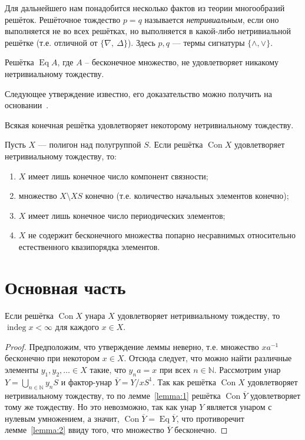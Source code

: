 \documentclass[11pt,twoside,final
]{article}
\def\Con{\operatorname{Con}}
\def\Eq{\operatorname{Eq}}
\def\indeg{\operatorname{indeg}}
\begin{document}
Для дальнейшего нам понадобится несколько фактов из теории многообразий решёток.
Решёточное тождество $p = q$ называется \textit{нетривиальным}, если оно выполняется не во всех решётках, но выполняется в какой-либо нетривиальной решётке (т.е. отличной от $\{\nabla,\ \Delta\}$).
Здесь $p,q$ — термы сигнатуры $\{ \land , \lor \}$.

\begin{lemma} \label{lemma:2}
	Решётка $\Eq A$, где $A$ -- бесконечное множество, не удовлетворяет никакому нетривиальному тождеству.
\end{lemma}

Следующее утверждение известно, его доказательство можно получить на основании~\cite[следствие 3.14 и теорема 8 главы VI]{Kohn_9}.
\begin{lemma}\label{lemma:3}
	Всякая конечная решётка удовлетворяет некоторому нетривиальному тождеству.
\end{lemma}

\begin{lemma} \label{lemma:4}
	Пусть $X$ — полигон над полугруппой $S$.
	Если решётка $\Con X$ удовлетворяет нетривиальному тождеству, то:
	\begin{enumerate}
		\item $X$ имеет лишь конечное число компонент связности;
		\item множество $X \setminus XS$ конечно (т.е. количество начальных элементов конечно);
		\item $X$ имеет лишь конечное число периодических элементов;
		\item $X$ не содержит бесконечного множества попарно несравнимых относительно естественного квазипорядка элементов.
	\end{enumerate}
\end{lemma}

\section{Основная часть}

\begin{lemma} \label{lemma:5}
	Если решётка $\Con X$ унара $X$ удовлетворяет нетривиальному тождеству, то $\indeg x < \infty$ для каждого $x \in X$.
\end{lemma}
\begin{proof}
	Предположим, что утверждение леммы неверно, т.е. множество $xa^{-1}$ бесконечно при некотором $x \in X$.
	Отсюда следует, что можно найти различные элементы $y_1, y_2, \ldots \in X $ такие, что $y_n a = x$ при всех $n \in \mathbb{N}$.
	Рассмотрим унар $Y = \bigcup_{n \in \mathbb{N}} y_n S$ и фактор-унар $\overline{Y} = Y / x S^1$.
	Так как решётка $\Con X$ удовлетворяет нетривиальному тождеству, то по лемме~\ref{lemma:1} решётка $\Con \overline{Y}$ удовлетворяет тому же тождеству.
	Но это невозможно, так как унар $Y$ является унаром с нулевым умножением, а значит, $\Con \overline{Y} = \Eq \overline{Y}$, что противоречит лемме~\ref{lemma:2} ввиду того, что множество $\overline{Y}$ бесконечно.
\end{proof}
\end{document}
